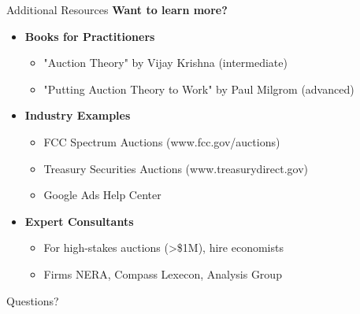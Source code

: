 \documentclass[xcolor={x11names}]{beamer}
\begin{document}
\begin{frame}{Additional Resources}
\textbf{Want to learn more?}

\begin{itemize}
  \item \textbf{Books for Practitioners}
  \begin{itemize}
    \item "Auction Theory" by Vijay Krishna (intermediate)
    \item "Putting Auction Theory to Work" by Paul Milgrom (advanced)
  \end{itemize}
  
  \item \textbf{Industry Examples}
  \begin{itemize}
    \item FCC Spectrum Auctions (www.fcc.gov/auctions)
    \item Treasury Securities Auctions (www.treasurydirect.gov)
    \item Google Ads Help Center
  \end{itemize}
  
  \item \textbf{Expert Consultants}
  \begin{itemize}
    \item For high-stakes auctions (>\$1M), hire economists
    \item Firms NERA, Compass Lexecon, Analysis Group
  \end{itemize}
\end{itemize}


\begin{center}
\large Questions?
\end{center}
\end{frame}
\end{document}
